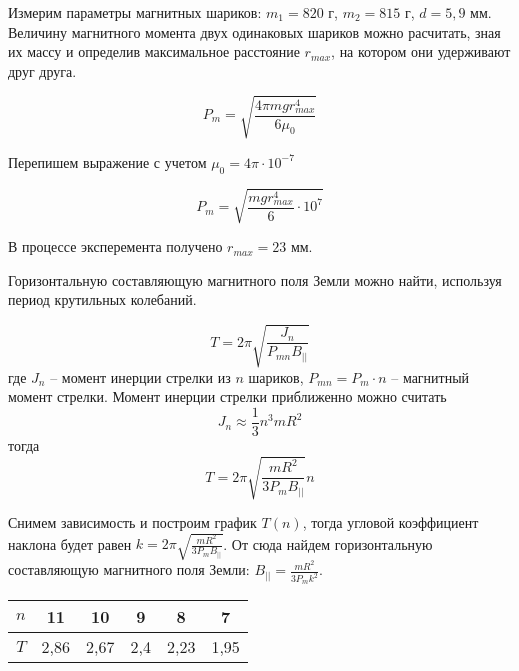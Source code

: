 



    Измерим параметры магнитных шариков: $m_1 = 820$ г, $m_2 = 815$ г, $d = 5,9$ мм.\\
    Величину магнитного момента двух одинаковых шариков можно расчитать, зная их массу и определив
    максимальное расстояние $r_{max}$, на котором они удерживают друг друга.

    \begin{equation*}
        P_m = \sqrt{\frac{4 \pi mg r_{max}^4}{6 \mu_0}}
    \end{equation*}

    Перепишем выражение с учетом $\mu_0 = 4 \pi \cdot 10^{-7}$

    \begin{equation*}
        P_m = \sqrt{\frac{mg r_{max}^4}{6} \cdot 10^7}
    \end{equation*}

    В процессе эксперемента получено $r_{max} = 23$ мм.

    \begin{center}
    \end{center}

    Горизонтальную составляющую магнитного поля Земли можно найти, используя период крутильных колебаний.

    \begin{equation*}
        T = 2 \pi \sqrt{\frac{J_n}{P_{mn} B_{||}}}
    \end{equation*}
    где $J_n$ -- момент инерции стрелки из $n$ шариков, $P_{mn} = P_m \cdot n$ -- магнитный момент стрелки.
    Момент инерции стрелки приближенно можно считать
    \begin{equation*}
        J_n \approx \frac{1}{3} n^3 m R^2
    \end{equation*} 
    тогда
    \begin{equation*}
        T = 2 \pi \sqrt{\frac{m R^2}{3 P_m B_{||}}} n
    \end{equation*}

    Снимем зависимость и построим график $T(n)$, тогда угловой коэффициент наклона будет равен $k = 2 \pi \sqrt{\frac{m R^2}{3 P_m B_{||}}}$.
    От сюда найдем горизонтальную составляющую магнитного поля Земли: $B_{||} = \frac{m R^2}{3 P_m k^2}$.

    \begin{table}[h!]
        \begin{center}
            \begin{tabular}{|c|c|c|c|c|c|}
                \hline
                $n$ & 11   & 10   & 9   & 8    & 7    \\ \hline
                $T$ & 2,86 & 2,67 & 2,4 & 2,23 & 1,95 \\ \hline
            \end{tabular}
        \end{center}
    \end{table}

